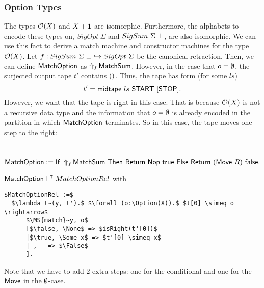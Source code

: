 \subsubsection{Option Types}
\label{sec:match-option}

The types $\Option(X)$ and $X+\Unit$ are isomorphic.  Furthermore, the alphabets to encode these types on, $SigOpt~\Sigma$ and $SigSum~\Sigma~\False$,
are also isomorphic.  We can use this fact to derive a match machine and constructor machines for the type $\Option(X)$.  Let
$f : SigSum~\Sigma~\False \hookrightarrow SigOpt~\Sigma$ be the canonical retraction.  Then, we can define $\MS{MatchOption}$ as
$\LiftAlphabet{\MS{MatchSum}}{f}$.  However, in the case that $o=\None$, the surjected output tape $t'$ contains $\unit$.  Thus, the tape has form
(for some $ls$)
\[ t' = \MS{midtape}~ls~\MS{START}~[\MS{STOP}]. \] However, we want that the tape is right in this case.  That is because $\Option(X)$ is not a
recursive data type and the information that $o=\None$ is already encoded in the partition in which $\MS{MatchOption}$ terminates.  So in this case,
the tape moves one step to the right:
\begin{definition}[$\MS{MatchOption}$]
  \label{def:MatchOption}
  ~
  \[
    \MS{MatchOption} := \If{\LiftAlphabet{\MS{MatchSum}}{f}}{\Return{\Nop}{\true}}{\Return{(\MS{Move}~R)}{\false}}.
  \]
\end{definition}

\begin{lemma}
  \label{lem:MatchSum_Realise}
  $\MS{MatchOption} \RealiseIn7 MatchOptionRel$ with
\begin{lstlisting}[style=semicoqstyle]
$MatchOptionRel :=$
  $\lambda t~(y, t').$ $\forall (o:\Option(X)).$ $t[0] \simeq o \rightarrow$
      $\MS{match}~y, o$
      [$\false, \None$ => $isRight(t'[0])$
      |$\true, \Some x$ => $t'[0] \simeq x$
      |_, _ => $\False$
      ].
\end{lstlisting}
\end{lemma}
Note that we have to add $2$ extra steps: one for the conditional and one for the $\MS{Move}$ in the $\None$-case.

